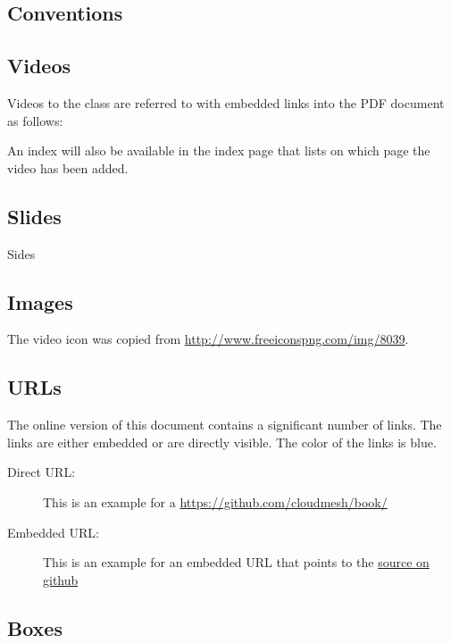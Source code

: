 \begin{enumerate}
\section{Conventions}

\subsection{Videos}

Videos to the class are referred to with embedded links into the PDF
document as follows: 


An index will also be available in the index page
that lists on which page the video has been added.

\subsection{Slides}

Sides

\subsection{Images}

The video icon was copied from \url{http://www.freeiconspng.com/img/8039}.

\subsection{URLs}

The online version of this document contains a significant number of
links. The links are either embedded or are directly visible. The
color of the links is blue.

\begin{description}
\item[Direct URL:] This is an example for a
  \url{https://github.com/cloudmesh/book/}
\item[Embedded URL:] This is an example for an embedded URL that
  points to the \href{https://github.com/cloudmesh/book/}{source on github}
\end{description}

\subsection{Boxes}


\end{enumerate}
